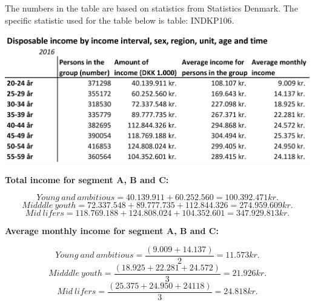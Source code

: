 The numbers in the table are based on statistics from Statistics Denmark. The specific statistic used for the table below is table: INDKP106. \cite{DanmarksStatistik} 

\begin{center}
\includegraphics[width=14cm]{Appendix/DisposableIncomeTotal.png}
\end{center}

\textbf{Total income for segment A, B and C:}


\begin{equation}
Young\:and\:ambitious = 40.139.911+60.252.560=100.392.471kr.
\label{YoungIncome}
\end{equation}
\label{MiddleIncome}
\begin{equation}
Midddle\:youth = 72.337.548+89.777.735+112.844.326=274.959.609kr.
\end{equation}
\label{MidIncome}
\begin{equation}
Mid\:lifers = 118.769.188+124.808.024+104.352.601=347.929.813kr. 
\end{equation}

\textbf{Average monthly income for segment A, B and C:}

\label{YoungIncomeAverage}
\begin{equation}
Young\:and\:ambitious =
\frac{(9.009+14.137)}{2}=11.573 kr.
\end{equation}
\label{MiddleIncomeAverage}
\begin{equation}
Midddle\:youth =
\frac{(18.925+22.281+24.572)}{3}=21.926 kr.
\end{equation}
\label{MiddleIncomeAverage}
\begin{equation}
Mid\:lifers =
\frac{(25.375+24.950+24118)}{3}=24.818 kr.
\end{equation}